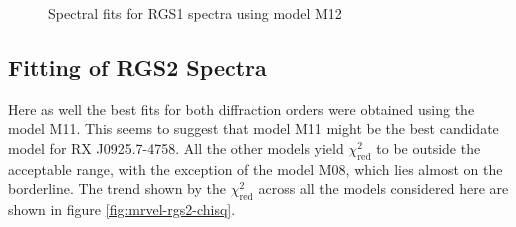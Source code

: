 			\begin{figure}[h!]
				\centering
				 \hfill
				\caption{Spectral fits for RGS1 spectra using model M12}
				\label{xmm:rgs1-m12}
			\end{figure}
		
		\clearpage
		\subsection{Fitting of RGS2 Spectra} \label{hi-resolution:analysis:rgs2}
			Here as well the best fits for both diffraction orders were obtained using the model M11. This seems to suggest that model M11 might be the best candidate model for RX J0925.7-4758. All the other models yield $\chi^2_\text{red}$ to be outside the acceptable range, with the exception of the model M08, which lies almost on the borderline. The trend shown by the $\chi^2_\text{red}$ across all the models considered here are shown in figure \ref{fig:mrvel-rgs2-chisq}.
			
